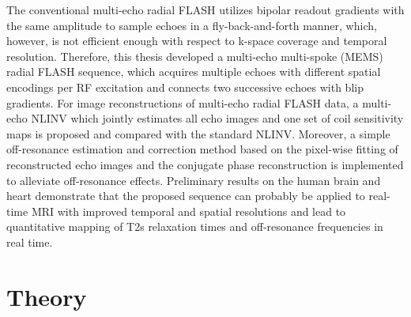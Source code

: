 The conventional multi-echo radial FLASH utilizes bipolar readout gradients with the same amplitude to sample echoes in a fly-back-and-forth manner, which, however, is not efficient enough with respect to k-space coverage and temporal resolution. Therefore, this thesis developed a multi-echo multi-spoke (\acs{MEMS}) radial FLASH sequence, which acquires multiple echoes with different spatial encodings per RF excitation and connects two successive echoes with blip gradients. For image reconstructions of multi-echo radial FLASH data, a multi-echo NLINV which jointly estimates all echo images and one set of coil sensitivity maps is proposed and compared with the standard NLINV. Moreover, a simple off-resonance estimation and correction method based on the pixel-wise fitting of reconstructed echo images and the conjugate phase reconstruction is implemented to alleviate off-resonance effects. Preliminary results on the human brain and heart demonstrate that the proposed sequence can probably be applied to real-time MRI with improved temporal and spatial resolutions and lead to quantitative mapping of \acs{T2s} relaxation times and off-resonance frequencies in real time.



\section{Theory} 

